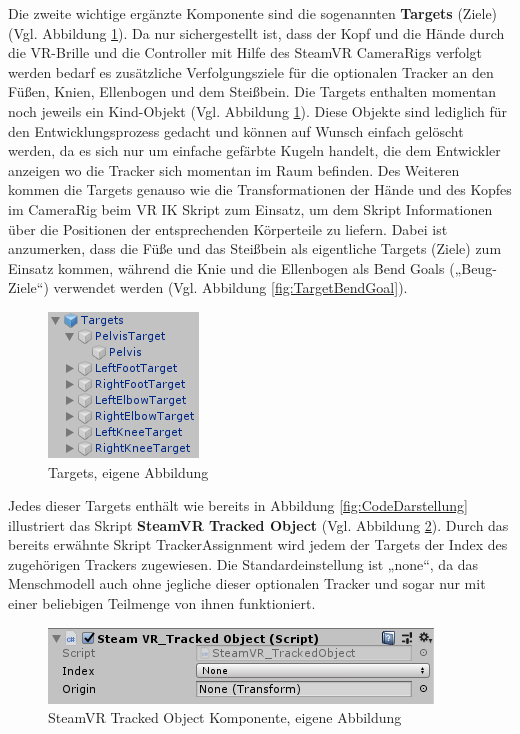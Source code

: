 \newline
Die zweite wichtige ergänzte Komponente sind die sogenannten \textbf{Targets} (Ziele) (Vgl. Abbildung \ref{fig:Targets}). Da nur sichergestellt ist, dass der Kopf und die Hände durch die VR-Brille und die Controller mit Hilfe des SteamVR CameraRigs verfolgt werden bedarf es zusätzliche Verfolgungsziele für die optionalen Tracker an den Füßen, Knien, Ellenbogen und dem Steißbein.
\newline
Die Targets enthalten momentan noch jeweils ein Kind-Objekt (Vgl. Abbildung \ref{fig:Targets}). Diese Objekte sind lediglich für den Entwicklungsprozess gedacht und können auf Wunsch einfach gelöscht werden, da es sich nur um einfache gefärbte Kugeln handelt, die dem Entwickler anzeigen wo die Tracker sich momentan im Raum befinden. 
\newline
Des Weiteren kommen die Targets genauso wie die Transformationen der Hände und des Kopfes im CameraRig beim VR IK Skript zum Einsatz, um dem Skript Informationen über die Positionen der entsprechenden Körperteile zu liefern. Dabei ist anzumerken, dass die Füße und das Steißbein als eigentliche Targets (Ziele) zum Einsatz kommen, während die Knie und die Ellenbogen als Bend Goals („Beug-Ziele“) verwendet werden (Vgl. Abbildung \ref{fig:TargetBendGoal}).
\begin{figure}[h]
	\centering
	\includegraphics[width=0.25\linewidth]{Bilder/A38_Targets}
	\caption{Targets, eigene Abbildung}
	\label{fig:Targets}
\end{figure}
\newline
Jedes dieser Targets enthält wie bereits in Abbildung \ref{fig:CodeDarstellung} illustriert das Skript \textbf{SteamVR Tracked Object} (Vgl. Abbildung \ref{fig:TrackedObject}). Durch das bereits erwähnte Skript TrackerAssignment wird jedem der Targets der Index des zugehörigen Trackers zugewiesen. Die Standardeinstellung ist „none“, da das Menschmodell auch ohne jegliche dieser optionalen Tracker und sogar nur mit einer beliebigen Teilmenge von ihnen funktioniert.
\begin{figure}[h]
	\centering
	\includegraphics[width=0.45\linewidth]{Bilder/A39_SteamVRTrackedObject}
	\caption{SteamVR Tracked Object Komponente, eigene Abbildung}
	\label{fig:TrackedObject}
\end{figure}

